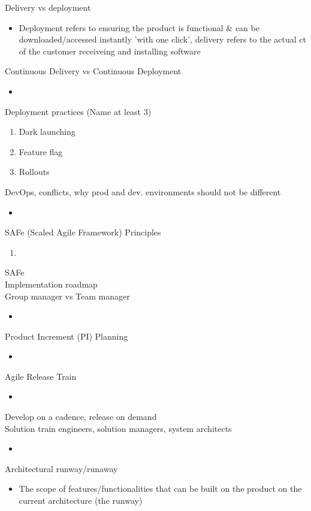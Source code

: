 \documentclass[10pt]{article}
\begin{document}
Delivery vs deployment
\begin{itemize}
\item Deployment refers to ensuring the product is functional \& can be downloaded/accessed instantly 'with one click', delivery refers to the actual ct of the customer receiveing and installing software
\end{itemize}
Continuous Delivery vs Continuous Deployment
\begin{itemize}
\item 
\end{itemize}
Deployment practices (Name at least 3)
\begin{enumerate}
\item Dark launching
\item Feature flag
\item Rollouts
\end{enumerate}
DevOps, conflicts, why prod and dev. environments should not be different
\begin{itemize}
\item 
\end{itemize}
SAFe (Scaled Agile Framework) Principles
\begin{enumerate}
\item 
\end{enumerate}
SAFe\\
Implementation roadmap\\
Group manager vs Team manager
\begin{itemize}
\item 
\end{itemize}
Product Increment (PI) Planning
\begin{itemize}
\item 
\end{itemize}
Agile Release Train
\begin{itemize}
\item 
\end{itemize}
Develop on a cadence, release on demand\\
Solution train engineers, solution managers, system architects
\begin{itemize}
\item 
\end{itemize}
Architectural runway/runaway
\begin{itemize}
\item The scope of features/functionalities that can be built on the product on the current architecture (the runway)
\end{itemize}
\end{document}
